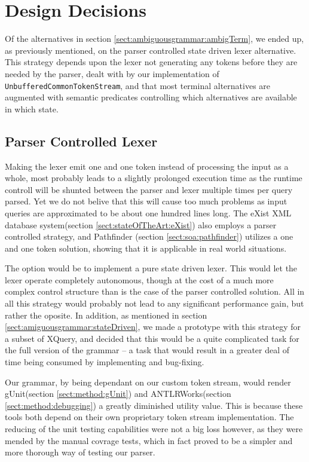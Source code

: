 \section{Design Decisions}
\label{sect:discussion:designDecisions}

Of the alternatives in section \ref{sect:ambiguousgrammar:ambigTerm}, we ended up, as previously mentioned, on the parser controlled state driven lexer alternative. This strategy depends upon the lexer not generating any tokens before they are needed by the parser, dealt with by our implementation of \verb!UnbufferedCommonTokenStream!, and that most terminal alternatives are augmented with semantic predicates controlling which alternatives are available in which state.

\subsection{Parser Controlled Lexer}
Making the lexer emit one and one token instead of processing the input as a whole, most probably leads to a slightly prolonged execution time as the runtime controll will be shunted between the parser and lexer multiple times per query parsed. Yet we do not belive that this will cause too much problems as input queries are approximated to be about one hundred lines long. The eXist XML database system(section \ref{sect:stateOfTheArt:eXist}) also employs a parser controlled strategy, and Pathfinder (section \ref{sect:soa:pathfinder}) utilizes a one and one token solution, showing that it is applicable in real world situations.

The option would be to implement a pure state driven lexer. This would let the lexer operate completely autonomous, though at the cost of a much more complex control structure than is the case of the parser controlled solution. All in all this strategy would probably not lead to any significant performance gain, but rather the oposite. In addition, as mentioned in section \ref{sect:amiguousgrammar:stateDriven}, we made a prototype with this strategy for a subset of XQuery, and decided that this would be a quite complicated task for the full version of the grammar -- a task that would result in a greater deal of time being consumed by implementing and bug-fixing.

Our grammar, by being dependant on our custom token stream, would render gUnit(section \ref{sect:method:gUnit}) and ANTLRWorks(section \ref{sect:method:debugging}) a greatly diminished utility value. This is because these tools both depend on their own proprietary token stream implementation. The reducing of the unit testing capabilities were not a big loss however, as they were mended by the manual covrage tests, which in fact proved to be a simpler and more thorough way of testing our parser. 


